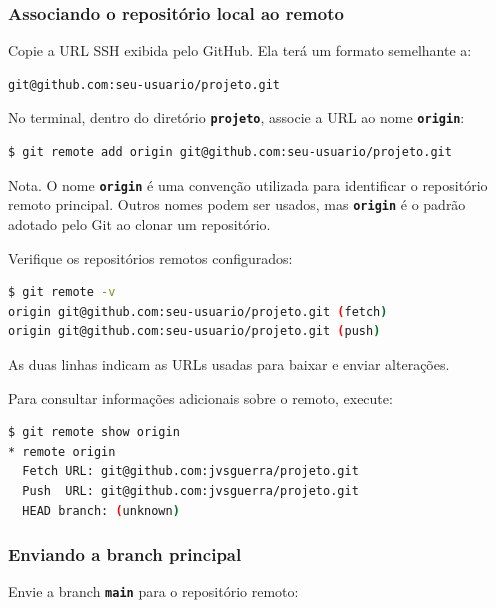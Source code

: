 \documentclass[12pt,a4paper]{article}
\begin{document}
\subsubsection{Associando o repositório local ao remoto}

Copie a URL SSH exibida pelo GitHub. Ela terá um formato semelhante a:

\begin{lstlisting}[language=bash]
git@github.com:seu-usuario/projeto.git
\end{lstlisting}

No terminal, dentro do diretório \textbf{\texttt{projeto}}, associe a URL ao nome \textbf{\texttt{origin}}:

\begin{lstlisting}[language=bash]
$ git remote add origin git@github.com:seu-usuario/projeto.git
\end{lstlisting}

\begin{question}{Nota.}
\footnotesize O nome \textbf{\texttt{origin}} é uma convenção utilizada para identificar o repositório remoto principal. Outros nomes podem ser usados, mas \textbf{\texttt{origin}} é o padrão adotado pelo Git ao clonar um repositório.
\end{question}

Verifique os repositórios remotos configurados:

\begin{lstlisting}[language=bash]
$ git remote -v
origin git@github.com:seu-usuario/projeto.git (fetch)
origin git@github.com:seu-usuario/projeto.git (push)
\end{lstlisting}

As duas linhas indicam as URLs usadas para baixar e enviar alterações.

Para consultar informações adicionais sobre o remoto, execute:

\begin{lstlisting}[language=bash]
$ git remote show origin
* remote origin
  Fetch URL: git@github.com:jvsguerra/projeto.git
  Push  URL: git@github.com:jvsguerra/projeto.git
  HEAD branch: (unknown)
\end{lstlisting}

\subsubsection{Enviando a branch principal}

Envie a branch \textbf{\texttt{main}} para o repositório remoto:
\end{document}
